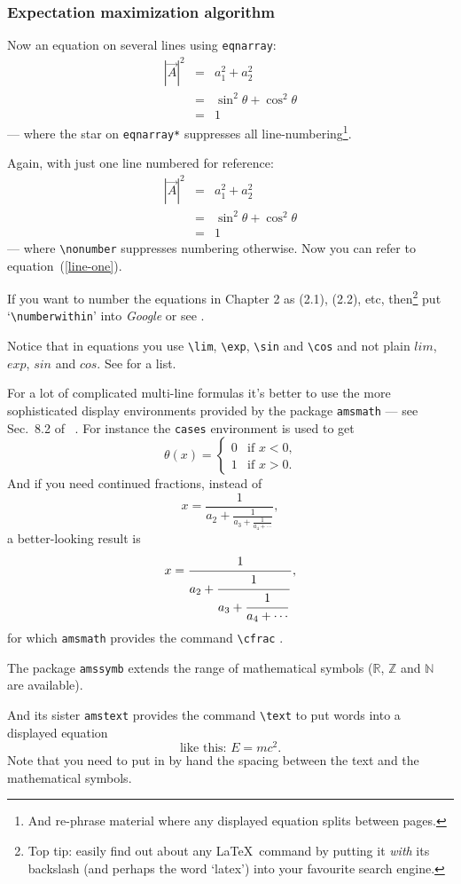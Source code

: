\subsubsection{Expectation maximization algorithm}
Now an equation on several lines using \verb+eqnarray+:
\begin{eqnarray*}
  |\vec A|^2 &=& a_1^2+a_2^2  \\
             &=& \sin^2\theta+\cos^2\theta \\
             &=& 1
\end{eqnarray*}--- where the star on \verb+eqnarray*+ suppresses
all line-numbering\footnote{And re-phrase material where any displayed
equation splits between pages.}.
\par
Again, with just one line numbered for reference:
\begin{eqnarray}
  |\vec A|^2 &=& a_1^2+a_2^2  \label{line-one}\\
             &=& \sin^2\theta+\cos^2\theta \nonumber \\
             &=& 1  \nonumber
\end{eqnarray}--- where \verb+\nonumber+ suppresses numbering
otherwise. Now you can refer to equation~(\ref{line-one}).
\par
If you want to number the equations in Chapter 2 as (2.1), (2.2), etc,
then\footnote{Top tip: easily find out about any \LaTeX\ command by
putting it \textit{with} its backslash (and perhaps the word \lq latex')
into your favourite search engine.} put \lq\verb+\numberwithin+' into
\textsl{Google} or see \cite[Sec 8.2.14]{MG}.
\par
Notice that in equations you use \verb+\lim+, \verb+\exp+, \verb+\sin+
and \verb+\cos+ and not plain $lim$, $exp$, $sin$ and $cos$. See
\cite[Sec.~3.3]{NSS} for a list.
\par
For a lot of complicated multi-line formulas it's better to use the more
sophisticated display environments provided by the package
\texttt{amsmath} --- see Sec.~8.2 of \comp\ \cite{MG}.
For instance the \texttt{cases} environment is used to get
\[\theta(x)=\begin{cases}0&\text{if $x<0$,}\\
		1&\text{if $x>0$.}\end{cases}\]
And if you need continued fractions, instead of 
\[x=\frac{1}{a_2+\frac{1}{a_3+\frac{1}{a_4+\cdots}}},\]a better-looking
result
is\[x=\frac{\strut1}{\displaystyle a_2+\frac{\strut1}{\displaystyle
a_3+\frac{\strut1}{\displaystyle a_4+\cdots}}},\]for which
\texttt{amsmath}
provides the command \verb+\cfrac+ \cite[Sec.~8.4.2]{MG}.
\par
The package \texttt{amssymb} \cite[Chap.~8]{MG} extends the range of
mathematical symbols (\eg\(\mathbb{R}\), \(\mathbb{Z}\) and
\(\mathbb{N}\) are available).
\par
And its sister \texttt{amstext} provides the command \verb+\text+ to
put words into a displayed equation \[ \text{like this: }E=mc^2. \]Note
that you need to put in by hand the spacing between the text and the
mathematical symbols.
%
